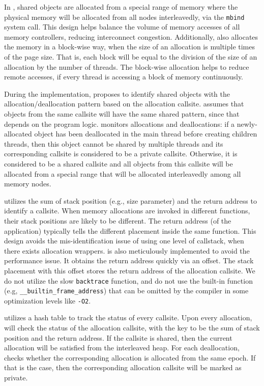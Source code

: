 In \NA{}, shared objects are allocated from a special range of memory where the physical memory will be allocated from all nodes interleavedly, via the \texttt{mbind} system call. This design helps balance the volume of memory accesses of all memory controllers, reducing interconnect congestion. Additionally, \NA{} also allocates the memory in a block-wise way, when the size of an allocation is multiple times of the page size. That is, each block will be equal to the division of the size of an allocation by the number of threads. The block-wise allocation helps to reduce remote accesses, if every thread is accessing a block of memory continuously. 
 
During the implementation, \NA{} proposes to identify shared objects with the allocation/deallocation pattern based on the allocation callsite. \NA{} assumes that objects from the same callsite will have the same shared pattern, since that depends on the program logic. \NA{} monitors allocations and deallocations: if a newly-allocated object has been deallocated in the main thread before creating children threads, then this object cannot be shared by multiple threads and its corresponding callsite is considered to be a private callsite. Otherwise, it is considered to be a shared callsite and all objects from this callsite will be allocated  from a special range that will be allocated interleavedly among all memory nodes. 

\NA{} utilizes the sum of stack position (e.g., size parameter) and the return address to identify a callsite. When memory allocations are invoked in different functions, their stack positions are likely to be different. The return address (of the application) typically tells the different placement inside the same function. This design  avoids the mis-identification issue of using one level of callstack, when there exists allocation wrappers. \NA{} is also meticulously implemented to avoid the performance issue. It obtains the return address quickly via an offset. The stack placement with this offset stores the return address of the allocation callsite. We do not utilize the slow \texttt{backtrace} function, and do not use the built-in function (e.g, \texttt{\_\_builtin\_frame\_address}) that can be omitted by the compiler in some optimization levels like \texttt{-O2}.  


\NA{} utilizes a hash table to track the status of every callsite. Upon every allocation, \NA{} will check the status of the allocation callsite, with the key to be the sum of stack position and the return address. If the callsite is shared, then the current allocation will be satisfied from the interleaved heap. For each deallocation, \NA{} checks whether the corresponding allocation is allocated from the same epoch. If that is the case, then the corresponding allocation callsite will be marked as  private. 

